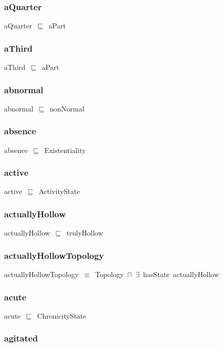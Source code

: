 \documentclass{article}
\begin{document}
\subsubsection*{aQuarter}

aQuarter~\ensuremath{\sqsubseteq}~aPart~

\subsubsection*{aThird}

aThird~\ensuremath{\sqsubseteq}~aPart~

\subsubsection*{abnormal}

abnormal~\ensuremath{\sqsubseteq}~nonNormal~

\subsubsection*{absence}

absence~\ensuremath{\sqsubseteq}~Existentiality~

\subsubsection*{active}

active~\ensuremath{\sqsubseteq}~ActivityState~

\subsubsection*{actuallyHollow}

actuallyHollow~\ensuremath{\sqsubseteq}~trulyHollow~

\subsubsection*{actuallyHollowTopology}

actuallyHollowTopology~\ensuremath{\equiv}~Topology~\ensuremath{\sqcap}~\ensuremath{\exists}~hasState~actuallyHollow

\subsubsection*{acute}

acute~\ensuremath{\sqsubseteq}~ChronicityState~

\subsubsection*{agitated}
\end{document}
